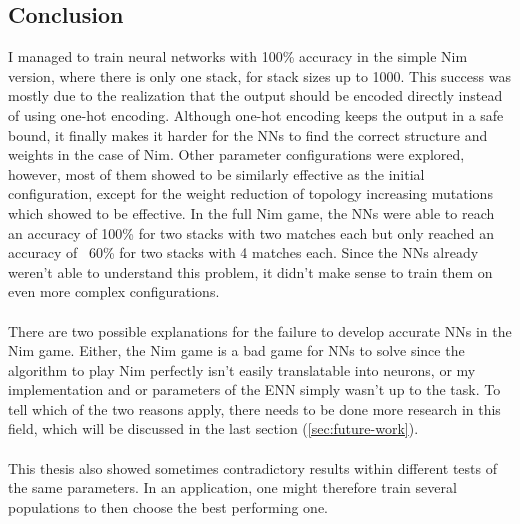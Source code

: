 \documentclass[11pt]{report}
\begin{document}
\begin{enumerate}
    \section{Conclusion}\label{sec:conclusion}
    I managed to train neural networks with 100\% accuracy in the simple Nim version, where there is only one stack, for stack sizes up to 1000.
    This success was mostly due to the realization that the output should be encoded directly instead of using one-hot encoding.
    Although one-hot encoding keeps the output in a safe bound, it finally makes it harder for the NNs to find the correct structure and weights in the case of Nim.
    Other parameter configurations were explored, however, most of them showed to be similarly effective as the initial configuration, except for the weight reduction of topology increasing mutations which showed to be effective.
    In the full Nim game, the NNs were able to reach an accuracy of 100\% for two stacks with two matches each but only reached an accuracy of ~60\% for two stacks with 4 matches each.
    Since the NNs already weren't able to understand this problem, it didn't make sense to train them on even more complex configurations.
    \\\\
    There are two possible explanations for the failure to develop accurate NNs in the Nim game.
    Either, the Nim game is a bad game for NNs to solve since the algorithm to play Nim perfectly isn't easily translatable into neurons, or my implementation and or parameters of the ENN simply wasn't up to the task.
    To tell which of the two reasons apply, there needs to be done more research in this field, which will be discussed in the last section (\ref{sec:future-work}).
    \\ \\
    This thesis also showed sometimes contradictory results within different tests of the same parameters.
    In an application, one might therefore train several populations to then choose the best performing one.



\end{enumerate}
\end{document}
